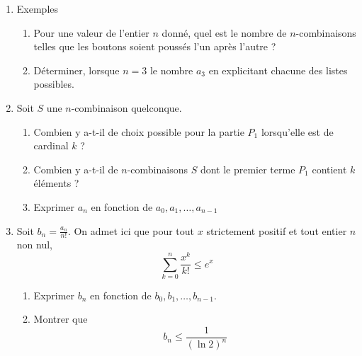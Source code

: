 \begin{enumerate}
\item Exemples
\begin{enumerate}
\item Pour une valeur de l'entier $n$ donn{\'e}, quel est le nombre de $n$-combinaisons telles que les boutons soient pouss{\'e}s l'un apr{\`e}s l'autre ?
\item D{\'e}terminer, lorsque $n=3$ le nombre $a_3$ en explicitant chacune des listes possibles.
\end{enumerate}
\item Soit $S$ une $n$-combinaison quelconque.
\begin{enumerate}
\item Combien y a-t-il de choix possible pour la partie $P_1$ lorsqu'elle est de cardinal $k$ ?
\item Combien y a-t-il de $n$-combinaisons $S$ dont le premier terme $P_1$ contient $k$ {\'e}l{\'e}ments ?
\item Exprimer $a_n$ en fonction de $a_0,a_1,\ldots,a_{n-1}$
\end{enumerate}
\item Soit $b_n=\frac{a_n}{n !}$.\newline
On admet ici que pour tout $x$ strictement positif et tout entier $n$ non nul,
$$\sum _{k=0}^{n}\frac{x^{k}}{k !}\leq e^{x}$$
\begin{enumerate}
\item Exprimer $b_n$ en fonction de $b_0,b_1,\ldots,b_{n-1}$.
\item Montrer que $$b_n\leq \frac{1}{(\ln 2)^n}$$
\end{enumerate}

\end{enumerate}
